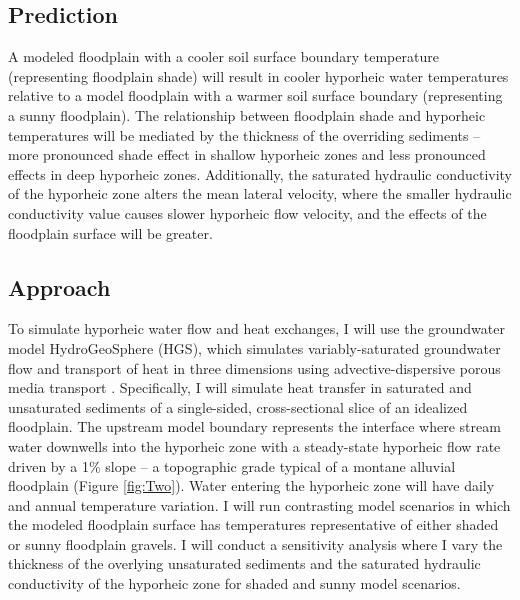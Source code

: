 \documentclass[a4paper]{article}
\begin{document}
\subsection*{Prediction}
A modeled floodplain with a cooler soil surface boundary temperature (representing floodplain shade) will result in cooler hyporheic water temperatures relative to a model floodplain with a warmer soil surface boundary (representing a sunny floodplain). The relationship between floodplain shade and hyporheic temperatures will be mediated by the thickness of the overriding sediments -- more pronounced shade effect in shallow hyporheic zones and less pronounced effects in deep hyporheic zones. Additionally, the saturated hydraulic conductivity of the hyporheic zone alters the mean lateral velocity, where the smaller hydraulic conductivity value causes slower hyporheic flow velocity, and the effects of the floodplain surface will be greater.




\subsection*{Approach}
To simulate hyporheic water flow and heat exchanges, I will use the groundwater model HydroGeoSphere (HGS), which simulates variably-saturated groundwater flow and transport of heat in three dimensions using advective-dispersive porous media transport \parencite{Brunner2012HydroGeoSphere:Model}. Specifically, I will simulate heat transfer in saturated and unsaturated sediments of a single-sided, cross-sectional slice of an idealized floodplain.  The upstream model boundary represents the interface where stream water downwells into the hyporheic zone with a steady-state hyporheic flow rate driven by a 1\% slope -- a topographic grade typical of a montane alluvial floodplain (Figure \ref{fig:Two}). Water entering the hyporheic zone will have daily and annual temperature variation. I will run contrasting model scenarios in which the modeled floodplain surface has temperatures representative of either shaded or sunny floodplain gravels. I will conduct a sensitivity analysis where I vary the thickness of the overlying unsaturated sediments and the saturated hydraulic conductivity of the hyporheic zone for shaded and sunny model scenarios.
\end{document}
